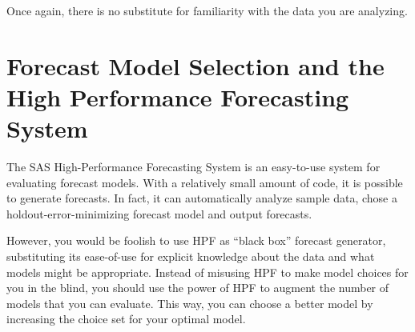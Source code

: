 \documentclass[10pt]{sugconf-ish}
\begin{document}
Once again, there is no substitute for familiarity with the data you are analyzing.




\section{Forecast Model Selection and the High Performance Forecasting System}

The SAS High-Performance Forecasting System is an easy-to-use system for evaluating forecast models. With a relatively small amount of code, it is possible to generate forecasts. In fact, it can automatically analyze sample data, chose a holdout-error-minimizing forecast model and output forecasts.

However, you would be foolish to use HPF as ``black box'' forecast generator, substituting its ease-of-use for explicit knowledge about the data and what models might be appropriate. Instead of misusing HPF to make model choices for you in the blind, you should use the power of HPF to augment the number of models that you can evaluate. This way, you can choose a better model by increasing the choice set for your optimal model.
\end{document}
